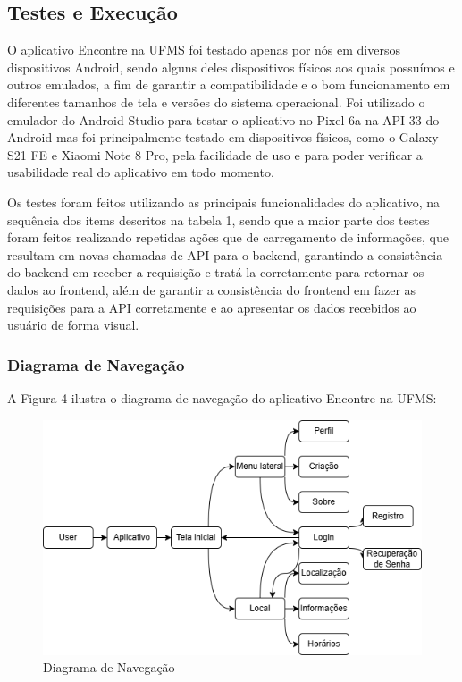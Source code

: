 \subsection{Testes e Execução}

    O aplicativo Encontre na UFMS foi testado apenas por nós em diversos dispositivos Android, sendo alguns deles dispositivos físicos aos quais possuímos e outros emulados, a fim de garantir a compatibilidade e o bom funcionamento em diferentes tamanhos de tela e versões do sistema operacional. Foi utilizado o emulador do Android Studio para testar o aplicativo no Pixel 6a na API 33 do Android mas foi principalmente testado em dispositivos físicos, como o Galaxy S21 FE e Xiaomi Note 8 Pro, pela facilidade de uso e para poder verificar a usabilidade real do aplicativo em todo momento.
    
    Os testes foram feitos utilizando as principais funcionalidades do aplicativo, na sequência dos items descritos na tabela 1, sendo que a maior parte dos testes foram feitos realizando repetidas ações que de carregamento de informações, que resultam em novas chamadas de API para o backend, garantindo a consistência do backend em receber a requisição e tratá-la corretamente para retornar os dados ao frontend, além de garantir a consistência do frontend em fazer as requisições para a API corretamente e ao apresentar os dados recebidos ao usuário de forma visual.

\subsubsection{Diagrama de Navegação}

    A Figura 4 ilustra o diagrama de navegação do aplicativo Encontre na UFMS:

    \begin{figure}[h]
        \centering
        \includegraphics[width=1\textwidth]{imagens/navegacao.png}
        \caption{\scriptsize Diagrama de Navegação}
        \label{fig:diagrama-navegacao}
    \end{figure}

